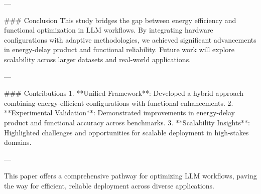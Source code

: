 ---

### Conclusion  
This study bridges the gap between energy efficiency and functional optimization in LLM workflows. By integrating hardware configurations with adaptive methodologies, we achieved significant advancements in energy-delay product and functional reliability. Future work will explore scalability across larger datasets and real-world applications.

---

### Contributions  
1. **Unified Framework**: Developed a hybrid approach combining energy-efficient configurations with functional enhancements.
2. **Experimental Validation**: Demonstrated improvements in energy-delay product and functional accuracy across benchmarks.
3. **Scalability Insights**: Highlighted challenges and opportunities for scalable deployment in high-stakes domains.

--- 

This paper offers a comprehensive pathway for optimizing LLM workflows, paving the way for efficient, reliable deployment across diverse applications.